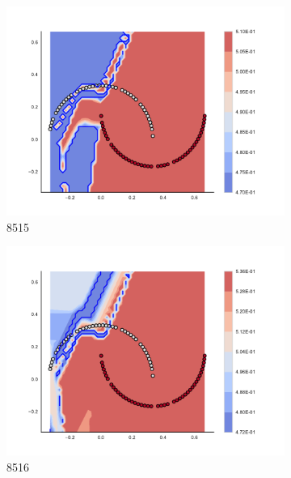 \begin{figure}[h]
\begin{subfigure}[b]{0.09\textwidth}
    \includegraphics[clip, trim=2.35cm 1.75cm 4.5cm 0cm,width=\textwidth]{img/convergence/8515.pdf}
    \caption{8515}
    \label{fig:convergence_8515}
\end{subfigure}
%
\begin{subfigure}[b]{0.09\textwidth}
    \includegraphics[clip, trim=2.35cm 1.75cm 4.5cm 0cm,width=\textwidth]{img/convergence/8516.pdf}
    \caption{8516}
    \label{fig:convergence_8516}
\end{subfigure}
%
\begin{subfigure}[b]{0.09\textwidth}

\end{subfigure}
\end{figure}

